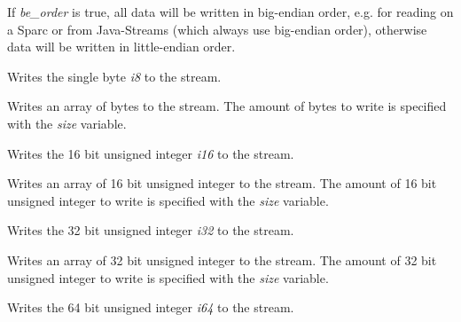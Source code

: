 \label{wxdataoutputstreambigendianorder}


If {\it be\_order} is true, all data will be written in big-endian
order, e.g. for reading on a Sparc or from Java-Streams (which
always use big-endian order), otherwise data will be written in
little-endian order.
 
\label{wxdataoutputstreamwrite8}


Writes the single byte {\it i8} to the stream.


Writes an array of bytes to the stream. The amount of bytes to write is
specified with the {\it size} variable.

\label{wxdataoutputstreamwrite16}


Writes the 16 bit unsigned integer {\it i16} to the stream.


Writes an array of 16 bit unsigned integer to the stream. The amount of
16 bit unsigned integer to write is specified with the {\it size} variable.

\label{wxdataoutputstreamwrite32}


Writes the 32 bit unsigned integer {\it i32} to the stream.


Writes an array of 32 bit unsigned integer to the stream. The amount of
32 bit unsigned integer to write is specified with the {\it size} variable.

\label{wxdataoutputstreamwrite64}


Writes the 64 bit unsigned integer {\it i64} to the stream.


